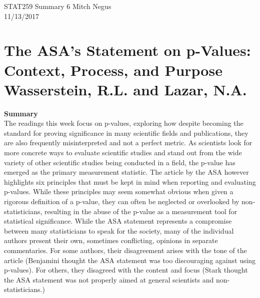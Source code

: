 \documentclass{report}
\newcommand{\tab}{\-\hspace{1cm}}
\begin{document}
\thispagestyle{empty}
\sffamily

\large {STAT259 Summary {6} \hfill Mitch Negus\\
		\hspace*{\fill} 11/13/2017\\ }
\section*{\textsf{The ASA's Statement on p-Values: Context, Process, and Purpose \\ \normalsize Wasserstein, R.L. and Lazar, N.A.}}

\textbf{Summary}\\
\tab The readings this week focus on p-values, exploring how despite becoming the standard for proving significance in many scientific fields and publications, they are also frequently misinterpreted and not a perfect metric. As scientists look for more concrete ways to evaluate scientific studies and stand out from the wide variety of other scientific studies being conducted in a field, the p-value has emerged as the primary measurement statistic. The article by the ASA however highlights six principles that must be kept in mind when reporting and evaluating p-values. While these principles may seem somewhat obvious when given a rigorous definition of a p-value, they can often be neglected or overlooked by non-statisticians, resulting in the abuse of the p-value as a measurement tool for statistical significance. While the ASA statement represents a compromise between many statisticians to speak for the society, many of the individual authors present their own, sometimes conflicting, opinions in separate commentaries. For some authors, their disagreement arises with the tone of the article (Benjamini thought the ASA statement was too discouraging against using p-values). For others, they disagreed with the content and focus (Stark thought the ASA statement was not properly aimed at general scientists and non-statisticians.)
\end{document}
